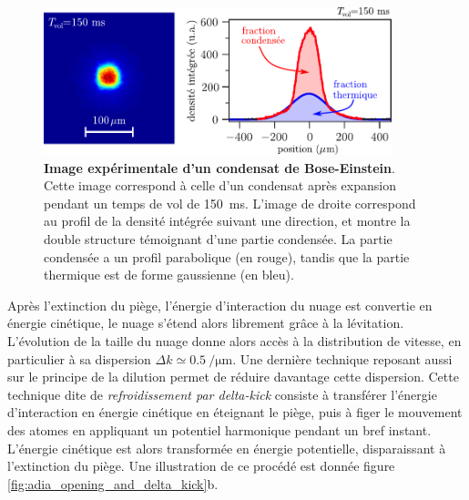 \begin{figure}
\centering
\includegraphics[width=0.9\textwidth]{Fig/BEC_manip/BEC_double_struct.pdf}
\caption{\textbf{Image expérimentale d'un condensat de Bose-Einstein}. Cette image correspond à celle d'un condensat après expansion pendant un temps de vol de \SI{150}{\milli\second}. L'image de droite correspond au profil de la densité intégrée suivant une direction, et montre la double structure témoignant d'une partie condensée. La partie condensée a un profil parabolique (en rouge), tandis que la partie thermique est de forme gaussienne (en bleu).}
\label{fig:BEC_double_struct}
\end{figure}

Après l'extinction du piège, l'énergie d'interaction du nuage est convertie en énergie cinétique, le nuage s'étend alors librement grâce à la lévitation. L'évolution de la taille du nuage donne alors accès à la distribution de vitesse, en particulier à sa dispersion $\Delta k \simeq \SI{0.5}{\per\micro\metre}$. Une dernière technique reposant aussi sur le principe de la dilution permet de réduire davantage cette dispersion. Cette technique dite de \emph{refroidissement par delta-kick} consiste à transférer l'énergie d'interaction en énergie cinétique en éteignant le piège, puis à figer le mouvement des atomes en appliquant un potentiel harmonique pendant un bref instant. L'énergie cinétique est alors transformée en énergie potentielle, disparaissant à l'extinction du piège. Une illustration de ce procédé est donnée figure \ref{fig:adia_opening_and_delta_kick}b.

